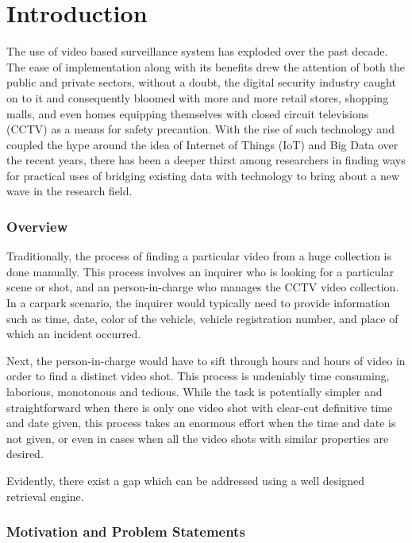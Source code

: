 \chapter{Introduction}
The use of video based surveillance system has exploded over the past decade. The ease of implementation along with its benefits drew the attention of both the public and private sectors, without a doubt, the digital security industry caught on to it and consequently bloomed with more and more retail stores, shopping malls, and even homes equipping themselves with closed circuit televisions (CCTV) as a means for safety precaution. With the rise of such technology and coupled the hype around the idea of Internet of Things (IoT) and Big Data over the recent years, there has been a deeper thirst among researchers in finding ways for practical uses of bridging existing data with technology to bring about a new wave in the research field.

\subsection{Overview}
\label{section:introduction}

Traditionally, the process of finding a particular video from a huge collection is done manually. This process involves an inquirer who is looking for a particular scene or shot, and an person-in-charge who manages the CCTV video collection. In a carpark scenario, the inquirer would typically need to provide information such as time, date, color of the vehicle, vehicle registration number, and place of which an incident occurred. 

Next, the person-in-charge would have to sift through hours and hours of video in order to find a distinct video shot. This process is undeniably time consuming, laborious, monotonous and tedious. While the task is potentially simpler and straightforward when there is only one video shot with clear-cut definitive time and date given, this process takes an enormous effort when the time and date is not given, or even in cases when all the video shots with similar properties are desired. 

Evidently, there exist a gap which can be addressed using a well designed retrieval engine.


\subsection{Motivation and Problem Statements}

